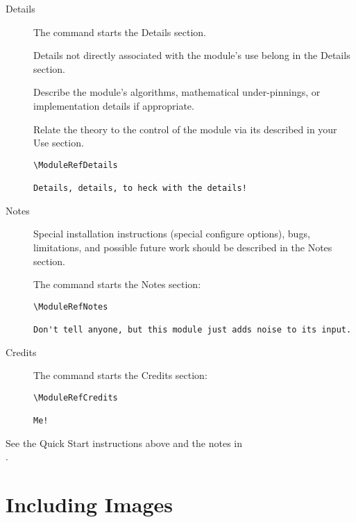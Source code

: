 \documentclass[11pt]{article}
\begin{document}
\begin{description}
\item[Details] \mbox{}
  \label{sec:details}
  
  The  command starts the Details section.

  Details not directly associated with the module's use belong in
  the Details section.
  
  Describe the module's algorithms, mathematical under-pinnings, or
  implementation details if appropriate.
  
  Relate the theory to the control of the module via its \gui{}
  described in your Use section.

\begin{verbatim}
\ModuleRefDetails

Details, details, to heck with the details!
\end{verbatim}

\item[Notes]\mbox{}
  \label{sec:notes}
  
  Special installation instructions (special configure options), bugs, limitations, and possible future work should be
  described in the Notes section.

  The  command starts the Notes section:

\begin{verbatim}
\ModuleRefNotes

Don't tell anyone, but this module just adds noise to its input.
\end{verbatim}

\item[Credits]\mbox{}
  \label{sec:credits}
  
  The  command starts the Credits section:

\begin{verbatim}
\ModuleRefCredits

Me!
\end{verbatim}
\end{description}

See the Quick Start instructions above and the notes in
\\
.

\section{Including Images}
\label{sec:inclimg}
\end{document}
